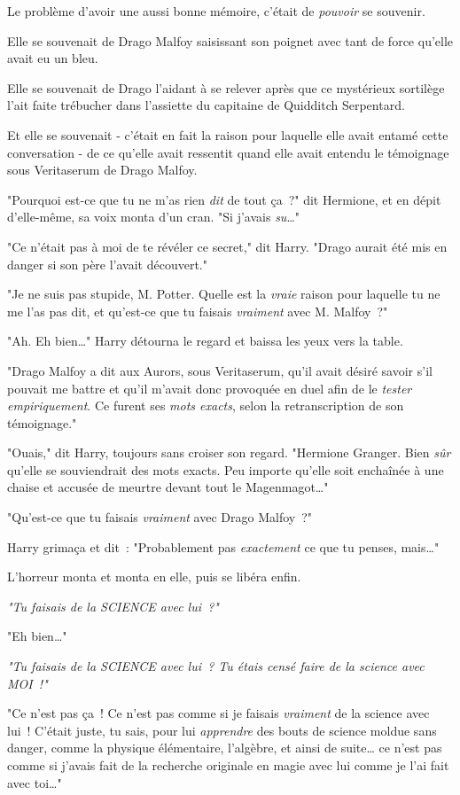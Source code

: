 Le problème d'avoir une aussi bonne mémoire, c'était de \emph{pouvoir} se souvenir.

Elle se souvenait de Drago Malfoy saisissant son poignet avec tant de force qu'elle avait eu un bleu.

Elle se souvenait de Drago l'aidant à se relever après que ce mystérieux sortilège l'ait faite trébucher dans l'assiette du capitaine de Quidditch Serpentard.

Et elle se souvenait - c'était en fait la raison pour laquelle elle avait entamé cette conversation - de ce qu'elle avait ressentit quand elle avait entendu le témoignage sous Veritaserum de Drago Malfoy.

"Pourquoi est-ce que tu ne m'as rien \emph{dit} de tout ça~?" dit Hermione, et en dépit d'elle-même, sa voix monta d'un cran. "Si j'avais \emph{su}…"

"Ce n'était pas à moi de te révéler ce secret," dit Harry. "Drago aurait été mis en danger si son père l'avait découvert."

"Je ne suis pas stupide, M. Potter. Quelle est la \emph{vraie} raison pour laquelle tu ne me l'as pas dit, et qu'est-ce que tu faisais \emph{vraiment} avec M. Malfoy~?"

"Ah. Eh bien…" Harry détourna le regard et baissa les yeux vers la table.

"Drago Malfoy a dit aux Aurors, sous Veritaserum, qu'il avait désiré savoir s'il pouvait me battre et qu'il m'avait donc provoquée en duel afin de le \emph{tester empiriquement}. Ce furent ses \emph{mots exacts}, selon la retranscription de son témoignage."

"Ouais," dit Harry, toujours sans croiser son regard. "Hermione Granger. Bien \emph{sûr} qu'elle se souviendrait des mots exacts. Peu importe qu'elle soit enchaînée à une chaise et accusée de meurtre devant tout le Magenmagot…"

"Qu'est-ce que tu faisais \emph{vraiment} avec Drago Malfoy~?"

Harry grimaça et dit~: "Probablement pas \emph{exactement} ce que tu penses, mais…"

L'horreur monta et monta en elle, puis se libéra enfin.

\emph{"Tu faisais de la SCIENCE avec lui~?"}

"Eh bien…"

\emph{"Tu faisais de la SCIENCE avec lui~? Tu étais censé faire de la science avec MOI~!"}

"Ce n'est pas ça~! Ce n'est pas comme si je faisais \emph{vraiment} de la science avec lui~! C'était juste, tu sais, pour lui \emph{apprendre} des bouts de science moldue sans danger, comme la physique élémentaire, l'algèbre, et ainsi de suite… ce n'est pas comme si j'avais fait de la recherche originale en magie avec lui comme je l'ai fait avec toi…"

